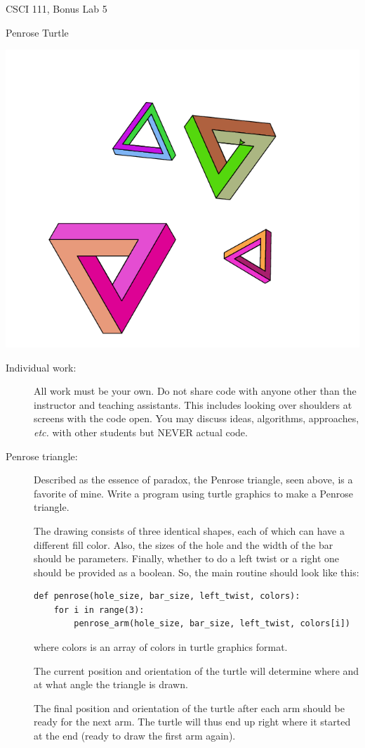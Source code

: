 \documentclass[12pt]{article}
\begin{document}
\sloppy
{}
\centerline{\Large CSCI 111, Bonus Lab 5}
\centerline{\large Penrose Turtle }

\centerline{\includegraphics[scale=0.75]{penrose}}

\begin{description}


\item[Individual work:]  All work must be your own.  Do not share
code with anyone other than the instructor and teaching assistants.
This includes looking over shoulders at screens with the code open.
You may discuss ideas, algorithms, approaches, {\em etc.} with
other students but NEVER actual code.

\item[Penrose triangle:]  Described as the essence of paradox,
the Penrose triangle, seen above, is a favorite of mine.
Write a program using turtle graphics to make a Penrose
triangle.

The drawing consists of three identical shapes, each of which
can have a different fill color.  Also, the sizes of the hole
and the width of the bar should be parameters.  Finally,
whether to do a left twist or a right one should be
provided as a boolean.  So,
the main routine should look like this:
\begin{lstlisting}
def penrose(hole_size, bar_size, left_twist, colors):
    for i in range(3):
        penrose_arm(hole_size, bar_size, left_twist, colors[i])
\end{lstlisting}
where colors is an array of colors in turtle graphics
format.

The current position and orientation of the turtle
will determine where and at what angle the triangle is drawn.

The final position and orientation of the turtle after each
arm should be ready for the next arm.  The turtle will thus
end up right where it started at the end (ready to draw the
first arm again).


\end{description}
\end{document}
